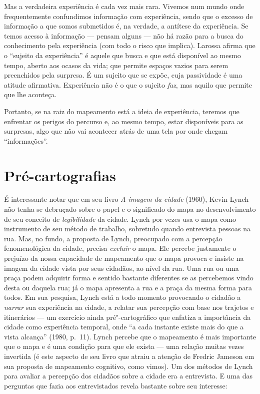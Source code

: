 Mas a verdadeira experiência é cada vez mais rara. Vivemos num mundo
onde frequentemente confundimos informação com experiência, sendo que o
excesso de informação a que somos submetidos é, na verdade, a antítese
da experiência. Se temos acesso à informação --- pensam alguns --- não há
razão para a busca do conhecimento pela experiência (com todo o risco
que implica). Larossa afirma que o ``sujeito da experiência'' é aquele
que busca e que está disponível ao mesmo tempo, aberto aos ocasos da
vida; que permite espaços vazios para serem preenchidos pela surpresa. É
um sujeito que se expõe, cuja passividade é uma atitude afirmativa.
Experiência não é o que o sujeito \emph{faz}, mas aquilo que permite que
lhe aconteça.

Portanto, se na raiz do mapeamento está a ideia de experiência, teremos
que enfrentar os perigos do percurso e, ao mesmo tempo, estar
disponíveis para as surpresas, algo que não vai acontecer atrás de uma
tela por onde chegam ``informações''.

\chapter{Pré-cartografias}

É interessante notar que em seu livro \emph{A imagem da cidade} (1960),
Kevin Lynch não tenha se debruçado sobre o papel e o significado do mapa
no desenvolvimento de seu conceito de \emph{legibilidade} da cidade.
Lynch por vezes usa o mapa como instrumento de seu método de trabalho,
sobretudo quando entrevista pessoas na rua. Mas, no fundo, a proposta de
Lynch, preocupado com a percepção fenomenológica da cidade, precisa
\emph{excluir} o mapa. Ele percebe justamente o prejuízo da nossa
capacidade de mapeamento que o mapa provoca e insiste na imagem da
cidade vista por seus cidadãos, ao nível da rua. Uma rua ou uma praça
podem adquirir forma e sentido bastante diferentes se as percebemos
vindo desta ou daquela rua; já o mapa apresenta a rua e a praça da mesma
forma para todos. Em sua pesquisa, Lynch está a todo momento provocando
o cidadão a \emph{narrar} sua experiência na cidade, a relatar sua
percepção com base nos trajetos e itinerários --- um exercício ainda
pré"-cartográfico que enfatiza a importância da cidade como experiência
temporal, onde ``a cada instante existe mais do que a vista alcança''
(1980, p.~11). Lynch percebe que o mapeamento é mais importante que o
mapa e é uma condição para que ele exista --- uma relação muitas vezes
invertida (é este aspecto de seu livro que atraiu a atenção de Fredric
Jameson em sua proposta de mapeamento cognitivo, como vimos). Um dos
métodos de Lynch para avaliar a percepção dos cidadãos sobre a cidade
era a entrevista. E uma das perguntas que fazia aos entrevistados revela
bastante sobre seu interesse:

